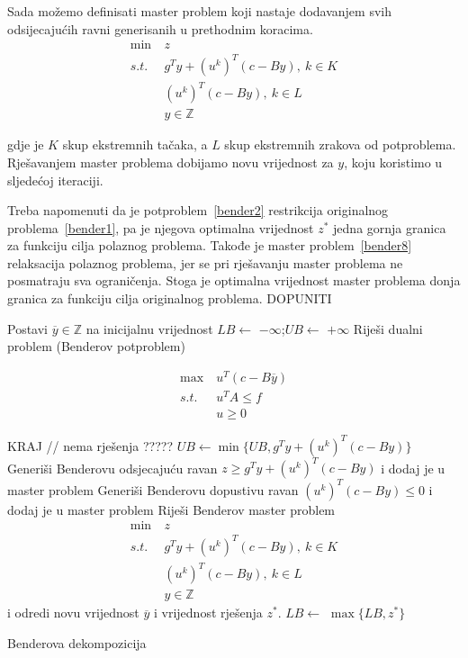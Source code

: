 \documentclass[a4paper, utf8, 11pt, colorlinks]{book}
\begin{document}
Sada možemo definisati master problem koji nastaje dodavanjem svih odsijecajućih ravni generisanih u prethodnim koracima.
  \begin{equation}
	\begin{aligned}\label{bender8}
		\min\ &z\\
		s.t.\ & g^Ty+(u^k)^T(c-By), \ k \in K\\
		& (u^k)^T(c-By), \ k \in L\\
		&y \in \mathbb{Z}
	\end{aligned}
\end{equation}
 
 gdje je $K$ skup ekstremnih tačaka, a $L$ skup ekstremnih zrakova od potproblema. Rješavanjem master problema dobijamo novu vrijednost za $y$, koju koristimo u sljedećoj iteraciji.
 
 Treba napomenuti da je potproblem~\ref{bender2} restrikcija originalnog problema~\ref{bender1}, pa je njegova optimalna vrijednost $z^*$ jedna gornja granica za funkciju cilja polaznog problema. Takođe je master problem~\ref{bender8} relaksacija polaznog problema, jer se pri rješavanju master problema ne posmatraju sva ograničenja. Stoga je optimalna vrijednost master problema donja granica za funkciju cilja originalnog problema.
 DOPUNITI
 

 
 
 \begin{algorithm}[!ht] \label{alg:bender}
 	\begin{algorithmic}[1] 
 		\STATE Postavi $\overline{y}\in\mathbb{Z}$ na inicijalnu vrijednost
 		\STATE 	$LB \gets$ $-\infty$;$UB \gets$ $+\infty$
 		\STATE Riješi dualni problem (Benderov potproblem)
 		
 		$$	\begin{aligned}
 			\max\ &u^T (c-B\overline{y})\\
 			s.t.\ &u^TA\leqslant f\\
 			&u\geqslant 0
 			\end{aligned}$$
 		
 		\STATE  KRAJ // nema  rješenja ?????
 		\ENDIF
 		\STATE $UB \gets \min\{UB,g^Ty+(u^k)^T(c-By)\}$
 		\STATE Generiši Benderovu odsjecajuću ravan $z\geqslant g^Ty+(u^k)^T(c-By)$ i dodaj je u master problem
 		\ENDIF
		\STATE Generiši Benderovu dopustivu ravan 	$(u^k)^T(c-By)\leqslant 0$ i dodaj je u master problem
		\ENDIF
		\STATE Riješi Benderov master problem
			$$\begin{aligned}
			\min\ &z\\
			s.t.\ & g^Ty+(u^k)^T(c-By), \ k \in K\\
			& (u^k)^T(c-By), \ k \in L\\
			&y \in \mathbb{Z}
		\end{aligned}$$
			i odredi novu vrijednost $\overline{y}$ i vrijednost rješenja $z^*$.
		\STATE $LB \gets$ $\max\{LB,z^*\}$
 		\ENDWHILE
 	\end{algorithmic}
 	\caption{Benderova dekompozicija}\label{alg:bender}
 \end{algorithm}
\end{document}
